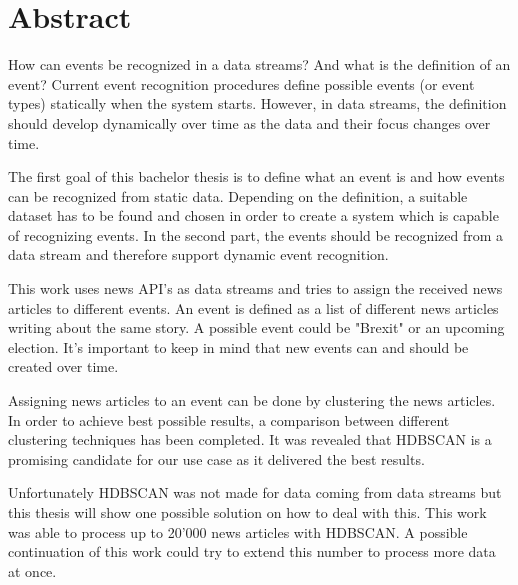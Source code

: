 
\section*{Abstract}

How can events be recognized in a data streams?
And what is the definition of an event?
Current event recognition procedures define possible events (or event types) statically when the system starts.
However, in data streams, the definition should develop dynamically over time as the data and their focus changes over time.

The first goal of this bachelor thesis is to define what an event is and how events can be recognized from static data.
Depending on the definition, a suitable dataset has to be found and chosen in order to create a system
which is capable of recognizing events.
In the second part, the events should be recognized from a data stream and therefore support dynamic event recognition.

This work uses news API's as data streams and tries to assign the received news articles to different events.
An event is defined as a list of different news articles writing about the same story.
A possible event could be "Brexit" or an upcoming election.
It's important to keep in mind that new events can and should be created over time.

Assigning news articles to an event can be done by clustering the news articles.
In order to achieve best possible results, a comparison between different clustering techniques has been completed.
It was revealed that HDBSCAN is a promising candidate for our use case as it delivered the best results.

Unfortunately HDBSCAN was not made for data coming from data streams but this thesis will show
one possible solution on how to deal with this.
This work was able to process up to 20'000 news articles with HDBSCAN.
A possible continuation of this work could try to extend this number to process more data at once.


